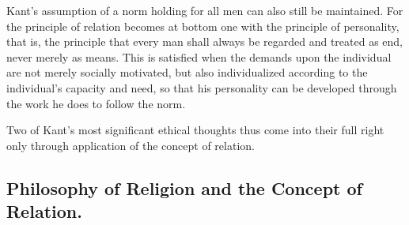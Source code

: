 \documentclass[12pt]{article}
\begin{document}
Kant's assumption of a norm holding for all men can also still be
maintained. For the principle of relation becomes at bottom one with the
principle of personality, that is, the principle that every man shall always
be regarded and treated as end, never merely as means. This is satisfied
when the demands upon the individual are not merely socially motivated, but
also individualized according to the individual's capacity and need, so that
his personality can be developed through the work he does to follow the
norm.

Two of Kant's most significant ethical thoughts thus come into their full
right only through application of the concept of relation.

\subsection{Philosophy of Religion and the Concept of Relation.}
\label{sec:4f}
\end{document}
